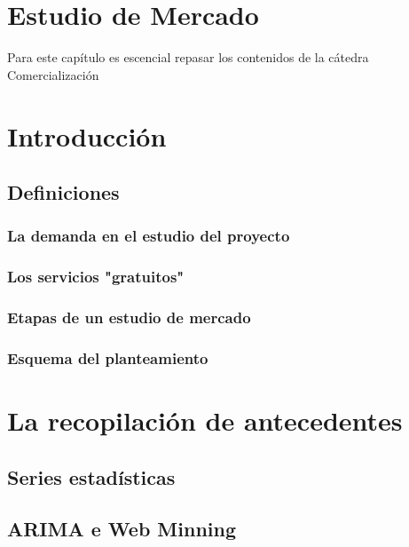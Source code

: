 \documentclass[crop=false]{standalone}
\begin{document}
\section{Estudio de Mercado}


Para este capítulo es escencial repasar los contenidos de la cátedra Comercialización

\blindtext

\section{Introducción}
\blindtext

\subsection{Definiciones}
\blindtext

\subsubsection{La demanda en el estudio del proyecto}
\blindtext

\subsubsection{Los servicios "gratuitos"}
\blindtext

\subsubsection{Etapas de un estudio de mercado}
\blindtext

\subsubsection{Esquema del planteamiento}

\section{La recopilación de antecedentes}


\subsection{Series estadísticas}


\blindtext


\subsection{ARIMA e Web Minning}
\end{document}
